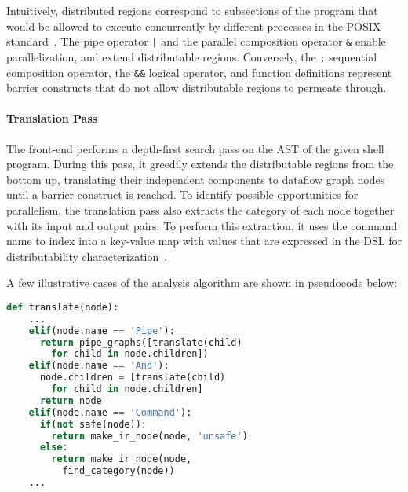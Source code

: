 \documentclass[acmsmall,10pt,review,anonymous]{acmart}
\newcommand{\ttt}[1]{\texttt{\small #1}}
\newcommand{\tr}[1]{} %
\begin{document}
Intuitively, distributed regions correspond to subsections of the program that would be allowed to execute concurrently by different processes in the POSIX standard~\cite{posix}.
The pipe operator \ttt{|} and the parallel composition operator \ttt{\&} enable parallelization, and extend distributable regions.
Conversely, the \ttt{;} sequential composition operator, the \ttt{\&\&} logical operator, and function definitions represent barrier constructs that do not allow distributable regions to permeate through.

% 
% 
% 

\paragraph{Translation Pass}
The \sys front-end performs a depth-first search pass on the AST of the given shell program.
During this pass, it greedily extends the distributable regions from the bottom up, translating their independent components to dataflow graph nodes until a barrier construct is reached.
To identify possible opportunities for parallelism, the translation pass also extracts the category of each node together with its input and output pairs.
To perform this extraction, it uses the command name to index into a key-value map with values that are expressed in the DSL for distributability characterization~.

A few illustrative cases of the analysis algorithm are shown in pseudocode below:

\begin{lstlisting}[language=python, float=h]
  def translate(node):
    ...
    elif(node.name == 'Pipe'):
      return pipe_graphs([translate(child)
        for child in node.children])
    elif(node.name == 'And'):
      node.children = [translate(child)
        for child in node.children]
      return node
    elif(node.name == 'Command'):
      if(not safe(node)):
        return make_ir_node(node, 'unsafe')
      else:
        return make_ir_node(node,
          find_category(node))
    ...
\end{lstlisting}
\end{document}
